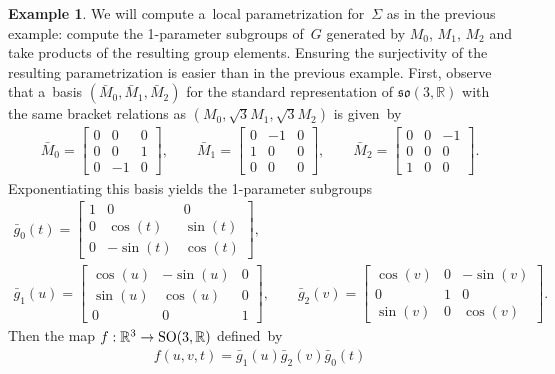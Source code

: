 \documentclass[pdftex]{sigma}
\numberwithin{equation}{section}
\theoremstyle{definition}
\newtheorem{exmpl}[teo]{Example}
\begin{document}
\begin{exmpl}
We will compute a~local parametrization for~$\Sigma$ as in the previous example: compute the 1-parameter subgroups
of~$G$ generated by $M_0$, $M_1$, $M_2$ and take products of the resulting group elements.
Ensuring the surjectivity of the resulting parametrization is easier than in the previous example.
First, observe that a~basis $(\bar{M}_0, \bar{M}_1, \bar{M}_2)$ for the standard representation of
$\mathfrak{so}(3,\mathbb{R})$ with the same bracket relations as $(M_0, \sqrt{3}M_1, \sqrt{3}M_2)$ is given~by
\begin{gather*}
\bar{M}_0 =
\begin{bmatrix}
0 & 0 & 0
\\
0 & 0 & 1
\\
0 & -1 & 0
\end{bmatrix},
\qquad
\bar{M}_1 =
\begin{bmatrix}
0 & -1 & 0
\\
1 & 0 & 0
\\
0 & 0 & 0
\end{bmatrix},
\qquad
\bar{M}_2 =
\begin{bmatrix}
0 & 0 & -1
\\
0 & 0 & 0
\\
1 & 0 & 0
\end{bmatrix}.
\end{gather*}
Exponentiating this basis yields the 1-parameter subgroups
\begin{gather*}
\bar{g}_0(t) =
\begin{bmatrix}
1 & 0 & 0
\\
0 & \cos(t) & \sin(t)
\\
0 & -\sin(t) & \cos(t)
\end{bmatrix},
\\
\bar{g}_1(u) =
\begin{bmatrix}
\cos (u) & -\sin (u) & 0
\\
\sin (u) & \cos (u) & 0
\\
0 & 0 & 1
\end{bmatrix},
\qquad
\bar{g}_2(v) =
\begin{bmatrix}
\cos (v) & 0 & -\sin (v)
\\
0 & 1 & 0
\\
\sin (v) & 0 & \cos (v)
\end{bmatrix}.
\end{gather*}
Then the map $f: \mathbb{R}^3 \to {\rm SO}(3,\mathbb{R})$ def\/ined~by
\begin{gather*}
f(u,v,t) = \bar{g}_1(u) \bar{g}_2(v) \bar{g}_0(t)
\\

\end{gather*}
\end{exmpl}
\end{document}
